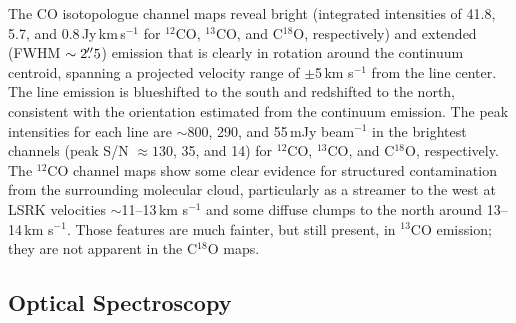 \documentclass[twocolumn]{aastex61}
\newcommand{\twelve}{CO}
\newcommand{\thirteen}{${}^{13}$CO}
\newcommand{\eighteen}{C${}^{18}$O}
\begin{document}
The CO isotopologue channel maps reveal bright (integrated intensities of 41.8, 5.7, and 0.8\,Jy\,km\,s$^{-1}$ for $^{12}$CO, $^{13}$CO, and C$^{18}$O, respectively) and extended (FWHM $\sim 2\mbox{$.\!\!^{\prime\prime}$}5$) emission that is clearly in rotation around the continuum centroid, spanning a projected velocity range of $\pm$5\,km s$^{-1}$ from the line center.  The line emission is blueshifted to the south and redshifted to the north, consistent with the orientation estimated from the continuum emission.  The peak intensities for each line are $\sim$800, 290, and 55\,mJy beam$^{-1}$ in the brightest channels (peak S/N $\approx 130$, 35, and 14) for $^{12}$CO, $^{13}$CO, and C$^{18}$O, respectively.  The $^{12}$CO channel maps show some clear evidence for structured contamination from the surrounding molecular cloud, particularly as a streamer to the west at LSRK velocities $\sim$11--13\,km s$^{-1}$ and some diffuse clumps to the north around 13--14\,km s$^{-1}$.  Those features are much fainter, but still present, in $^{13}$CO emission; they are not apparent in the C$^{18}$O maps.








\subsection{Optical Spectroscopy \label{sec:spectroscopy}}
\end{document}
